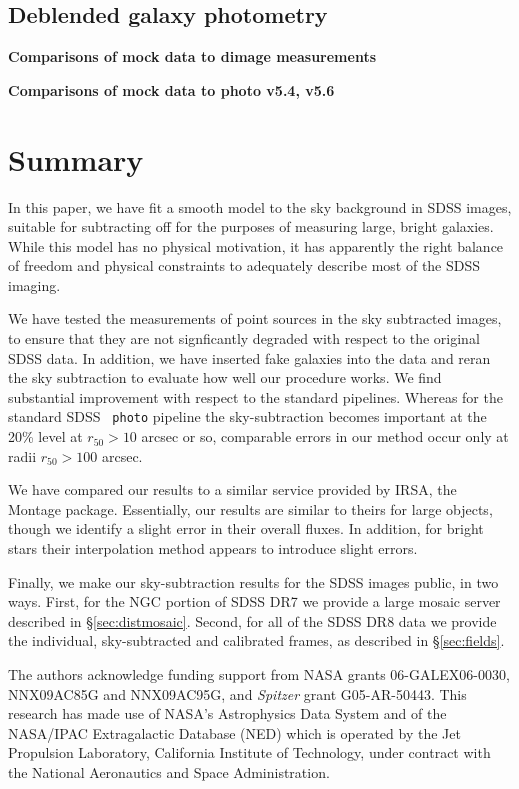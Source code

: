 \documentclass[10pt,preprint]{aastex}
\begin{document}
\subsection{Deblended galaxy photometry}
\label{sec:deblendgal}

{\bf Comparisons of mock data to dimage measurements}

{\bf Comparisons of mock data to photo v5.4, v5.6}

\section{ Summary}

In this paper, we have fit a smooth model to the sky background in
SDSS images, suitable for subtracting off for the purposes of
measuring large, bright galaxies.  While this model has no physical
motivation, it has apparently the right balance of freedom and
physical constraints to adequately describe most of the SDSS imaging.

We have tested the measurements of point sources in the sky subtracted
images, to ensure that they are not signficantly degraded with respect
to the original SDSS data.  In addition, we have inserted fake
galaxies into the data and reran the sky subtraction to evaluate how
well our procedure works.  We find substantial improvement with
respect to the standard pipelines.  Whereas for the standard SDSS {\tt
photo} pipeline the sky-subtraction becomes important at the 20\%
level at $r_{50}>10$ arcsec or so, comparable errors in our method
occur only at radii $r_{50}>100$ arcsec. 

We have compared our results to a similar service provided by IRSA,
the Montage package. Essentially, our results are similar to theirs
for large objects, though we identify a slight error in their overall
fluxes. In addition, for bright stars their interpolation method
appears to introduce slight errors.

Finally, we make our sky-subtraction results for the SDSS images
public, in two ways.  First, for the NGC portion of SDSS DR7 we
provide a large mosaic server described in \S\ref{sec:distmosaic}.
Second, for all of the SDSS DR8 data we provide the individual,
sky-subtracted and calibrated frames, as described in
\S\ref{sec:fields}.

\acknowledgments

The authors acknowledge funding support from NASA grants
06-GALEX06-0030, NNX09AC85G and NNX09AC95G, and \emph{Spitzer} grant
G05-AR-50443. This research has made use of NASA's Astrophysics Data
System and of the NASA/IPAC Extragalactic Database (NED) which is
operated by the Jet Propulsion Laboratory, California Institute of
Technology, under contract with the National Aeronautics and Space
Administration.
\end{document}

